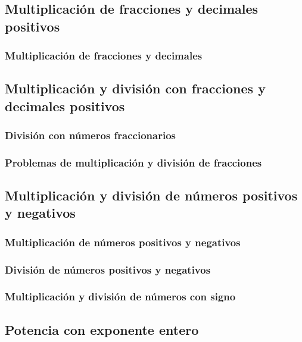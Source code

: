 \documentclass[11pt]{book}
\begin{document}
\pagestyle{empty}

\restoregeometry
{}
\tableofcontents
\chapter{}
\pagestyle{fancy}
\section{Multiplicación de fracciones y decimales positivos}
\subsection{Multiplicación de fracciones y decimales}

\section{Multiplicación y división con fracciones y decimales positivos}
\subsection{División con números fraccionarios}
\subsection{Problemas de multiplicación y división de fracciones}

\section{Multiplicación y división de números positivos y negativos}
\subsection{Multiplicación de números positivos y negativos}
\subsection{División de números positivos y negativos}
\subsection{Multiplicación y división de números con signo}

\section{Potencia con exponente entero}
\end{document}
